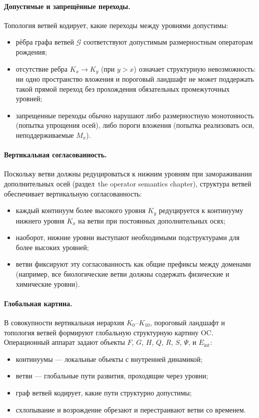 \paragraph{Допустимые и запрещённые переходы.}
Топология ветвей кодирует, какие переходы между уровнями допустимы:
\begin{itemize}
  \item рёбра графа ветвей \(\mathcal{G}\) соответствуют допустимым
        размерностным операторам рождения;
  \item отсутствие ребра \(K_x \to K_y\) (при \(y>x\)) означает
        структурную невозможность: ни одно пространство вложения и пороговый
        ландшафт не может поддержать такой прямой переход без прохождения
        обязательных промежуточных уровней;
  \item запрещенные переходы обычно нарушают либо размерностную монотонность
        (попытка упрощения осей), либо пороги вложения
        (попытка реализовать оси, неподдерживаемые \(M_x\)).
\end{itemize}

\paragraph{Вертикальная согласованность.}
Поскольку ветви должны редуцироваться к нижним уровням при замораживании
дополнительных осей (раздел~the operator semantics chapter), структура ветвей
обеспечивает вертикальную согласованность:
\begin{itemize}
  \item каждый континуум более высокого уровня \(K_y\) редуцируется к
        континууму нижнего уровня \(K_x\) на ветви при постоянных
        дополнительных осях;
  \item наоборот, нижние уровни выступают необходимыми подструктурами для
        более высоких уровней;
  \item ветви фиксируют эту согласованность как общие префиксы между
        доменами (например, все биологические ветви должны содержать
        физические и химические уровни).
\end{itemize}

\paragraph{Глобальная картина.}
В совокупности вертикальная иерархия \(K_0\)–\(K_{10}\), пороговый
ландшафт и топология ветвей формируют глобальную структурную картину OC.
Операционный аппарат задают объекты \(F\), \(G\), \(H\), \(Q\), \(R\),
\(S\), \(\Psi\), и \(E_{\mathrm{int}}\):
\begin{itemize}
  \item континуумы — локальные объекты с внутренней динамикой;
  \item ветви — глобальные пути развития, проходящие через уровни;
  \item граф ветвей кодирует, какие пути структурно допустимы;
  \item схлопывание и возрождение обрезают и перестраивают ветви со временем.
\end{itemize}

